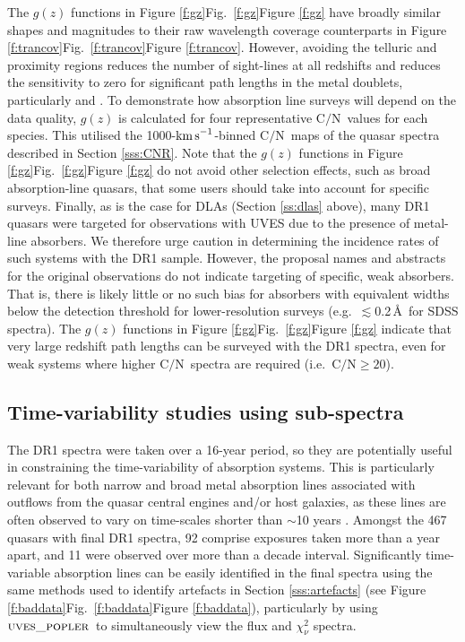 \documentclass[fleqn,usenatbib,usedcolumn]{mnras}
\renewcommand{\la}{\lesssim} %
\newcommand{\Sref}[1]{Section \ref{#1}}
\newcommand{\Fref}[1]{\ifhmode \ifnum\spacefactor=1001 Figure \ref{#1}\else Fig.\ \ref{#1}\fi \else Figure \ref{#1}\fi}
\newcommand{\kms}{\ensuremath{\textrm{km\,s}^{-1}}}
\newcommand{\CN}{\ensuremath{\textrm{C/N}}}
\newcommand{\popler}{\ensuremath{\textsc{uves\_popler}}}
\begin{document}
The $g(z)$ functions in \Fref{f:gz} have broadly similar shapes and magnitudes to their raw wavelength coverage counterparts in \Fref{f:trancov}. However, avoiding the telluric and proximity regions reduces the number of sight-lines at all redshifts and reduces the sensitivity to zero for significant path lengths in the metal doublets, particularly  and . To demonstrate how absorption line surveys will depend on the data quality, $g(z)$ is calculated for four representative \CN\ values for each species. This utilised the 1000-\kms-binned \CN\ maps of the quasar spectra described in \Sref{sss:CNR}. Note that the $g(z)$ functions in \Fref{f:gz} do not avoid other selection effects, such as broad absorption-line quasars, that some users should take into account for specific surveys. Finally, as is the case for DLAs (\Sref{ss:dlas} above), many DR1 quasars were targeted for observations with UVES due to the presence of metal-line absorbers. We therefore urge caution in determining the incidence rates of such systems with the DR1 sample. However, the proposal names and abstracts for the original observations do not indicate targeting of specific, weak absorbers. That is, there is likely little or no such bias for absorbers with equivalent widths below the detection threshold for lower-resolution surveys (e.g.\ $\la$0.2\,\AA\ for SDSS spectra). The $g(z)$ functions in \Fref{f:gz} indicate that very large redshift path lengths can be surveyed with the DR1 spectra, even for weak systems where higher \CN\ spectra are required (i.e.\ $\CN\ge20$).



\subsection{Time-variability studies using sub-spectra}\label{ss:subspec}

The DR1 spectra were taken over a 16-year period, so they are potentially useful in constraining the time-variability of absorption systems. This is particularly relevant for both narrow and broad metal absorption lines associated with outflows from the quasar central engines and/or host galaxies, as these lines are often observed to vary on time-scales shorter than $\sim$10 years \citep[e.g][]{Hamann:2011:1957,RodriguezHidalgo:2013:14}. Amongst the 467 quasars with final DR1 spectra, 92 comprise exposures taken more than a year apart, and 11 were observed over more than a decade interval. Significantly time-variable absorption lines can be easily identified in the final spectra using the same methods used to identify artefacts in \Sref{sss:artefacts} (see \Fref{f:baddata}), particularly by using \popler\ to simultaneously view the flux and $\chi^2_\nu$ spectra.
\end{document}
